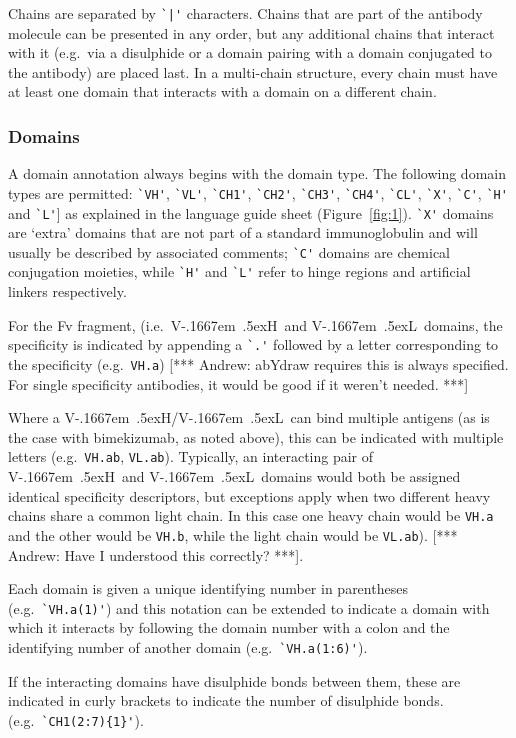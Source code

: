 \documentclass[a4]{article}
\newcommand{\VH}{\mbox{V\kern-.1667em \lower.5ex\hbox{\scriptsize H}}}
\newcommand{\VL}{\mbox{V\kern-.1667em \lower.5ex\hbox{\scriptsize L}}}
\newcommand{\VHVL}{\mbox{\VH/\VL}}
\newcommand{\andrew}[1]{{\color{red} [*** Andrew: #1 ***]}}
\begin{document}
Chains are separated by \verb.`|'.
characters. Chains that are part of the antibody molecule can be
presented in any order, but any additional chains that interact with it
(e.g.\ via a disulphide or a domain pairing with a domain conjugated to the antibody)
are placed last. In a multi-chain structure, every chain must have at least one domain
that interacts with a domain on a different chain.

\subsubsection{Domains}
A domain annotation always begins with the domain type.
The following domain types are permitted: 
\verb|`VH'|, \verb|`VL'|,
\verb|`CH1'|, \verb|`CH2'|, \verb|`CH3'|, \verb|`CH4'|, \verb|`CL'|,
\verb|`X'|, \verb|`C'|, \verb|`H'| and \verb|`L'|] as explained in the
language guide sheet (Figure~\ref{fig:1}). 
\verb|`X'| domains are `extra' domains that are not part of a
standard immunoglobulin and will usually be described by associated comments;
\verb|`C'| domains are chemical conjugation moieties, while \verb|`H'|
and \verb|`L'| refer to hinge regions and artificial linkers respectively.

For the Fv fragment, (i.e.\ \VH\ and \VL\ domains, the specificity is
indicated by appending a \verb|`.'| followed by a letter corresponding
to the specificity (e.g.\ \verb|VH.a|)  \andrew{abYdraw requires this
  is always specified. For single specificity antibodies, it would be
  good if it weren't needed.}

Where a \VHVL\ can bind multiple antigens (as is the case with
bimekizumab, as noted above), this can be indicated with multiple
letters (e.g.\ \verb|VH.ab|, \verb|VL.ab|).
Typically, an interacting pair of \VH\ and \VL\ domains
would both be assigned identical specificity descriptors, but
exceptions apply when two different heavy chains share a common light
chain.
In this case one heavy chain would be \verb|VH.a| and the other would
be \verb|VH.b|, while the light chain would be \verb|VL.ab|).
\andrew{Have I understood this correctly?}.


Each domain is given a unique identifying number in parentheses (e.g.\
\verb|`VH.a(1)'|) and this notation can be extended to indicate a domain
with which it interacts by following the domain number with a colon
and the identifying number of another domain (e.g.\
\verb|`VH.a(1:6)'|).

If the interacting domains have disulphide bonds between them, these
are indicated in curly brackets to indicate
the number of disulphide bonds. (e.g.\ \verb|`CH1(2:7){1}'|).
\end{document}
